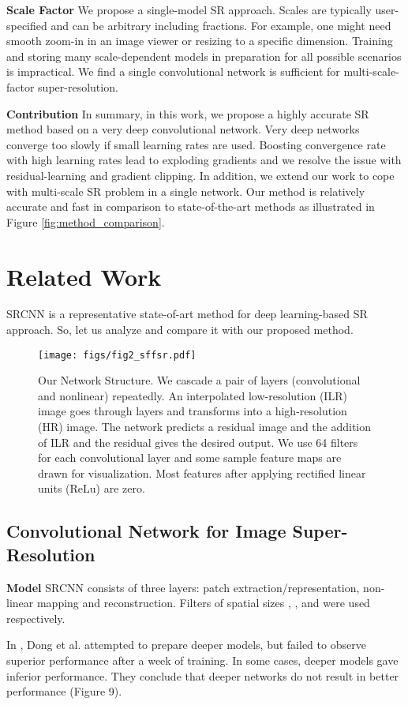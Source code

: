 \documentclass[10pt,twocolumn,letterpaper]{article}
\begin{document}
\textbf{Scale Factor} We propose a single-model SR approach. Scales are typically user-specified and can be arbitrary including fractions. For example, one might need smooth zoom-in in an image viewer or resizing to a specific dimension. Training and storing many scale-dependent models in preparation for all possible scenarios is impractical. We find a single convolutional network is sufficient for multi-scale-factor super-resolution.

\textbf{Contribution} In summary, in this work, we propose a highly accurate SR method based on a very deep convolutional network. Very deep networks converge too slowly if small learning rates are used. Boosting convergence rate with high learning rates lead to exploding gradients and we resolve the issue with residual-learning and gradient clipping. In addition, we extend our work to cope with multi-scale SR problem in a single network. Our method is relatively accurate and fast in comparison to state-of-the-art methods as illustrated in Figure \ref{fig:method_comparison}.

\section{Related Work}
SRCNN is a representative state-of-art method for deep learning-based SR approach. So, let us analyze and compare it with our proposed method.
\begin{figure*}[t]
\texttt{[image: figs/fig2\_sffsr.pdf]}
\caption{Our Network Structure. We cascade a pair of layers (convolutional and nonlinear) repeatedly. An interpolated low-resolution (ILR) image goes through layers and transforms into a high-resolution (HR) image. The network predicts a residual image and the addition of ILR and the residual gives the desired output. We use 64 filters for each convolutional layer and some sample feature maps are drawn for visualization. Most features after applying rectified linear units (ReLu) are zero.}
\label{fig:network}
\end{figure*}

\subsection{Convolutional Network for Image Super-Resolution}
\textbf{Model}
SRCNN consists of three layers: patch extraction/representation, non-linear mapping and reconstruction. Filters of spatial sizes , , and  were used respectively. 

In \cite{dong2015image}, Dong et al. attempted to prepare deeper models, but failed to observe superior performance after a week of training. In some cases, deeper models gave inferior performance. They conclude that deeper networks do not result in better performance (Figure 9).
\end{document}
